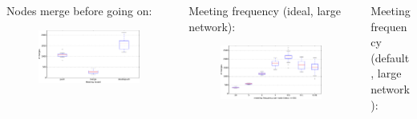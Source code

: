 \documentclass[final,hyperref={pdfpagelabels=false}]{beamer}
\begin{document}
\begin{frame}
\begin{columns}
\begin{column}{.9\textwidth}
  \begin{columns}
  \begin{column}{.3\textwidth}
    \begin{center}
       Nodes merge before going on:
    \end{center}
    \begin{figure}
      \includegraphics[width=\linewidth]{fig/bidi_n=20.pdf}
    \end{figure}
  \end{column}
  \begin{column}{.3\textwidth}
    \begin{center}
    Meeting frequency (ideal, large network):
    \end{center}
    \begin{figure}
      \includegraphics[width=\linewidth]{fig/global_meeting_frequency_n=30.pdf}
    \end{figure}
  \end{column}
  \begin{column}{.3\textwidth}
    \begin{center}
    Meeting frequency (default, large network):
    \end{center}
    \begin{figure}

\end{figure}
\end{column}
\end{columns}
\end{column}
\end{columns}
\end{frame}
\end{document}
